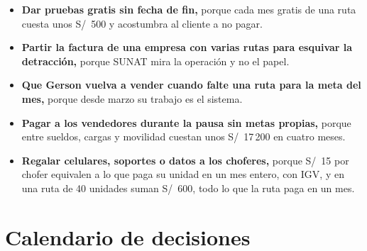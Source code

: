 \documentclass[10.5pt,a4paper]{article}
\begin{document}
\begin{itemize}
\item \textbf{Dar pruebas gratis sin fecha de fin,} porque cada mes gratis de una ruta cuesta unos S/~500 y acostumbra al cliente a no pagar.
\item \textbf{Partir la factura de una empresa con varias rutas para esquivar la detracción,} porque SUNAT mira la operación y no el papel.
\item \textbf{Que Gerson vuelva a vender cuando falte una ruta para la meta del mes,} porque desde marzo su trabajo es el sistema.
\item \textbf{Pagar a los vendedores durante la pausa sin metas propias,} porque entre sueldos, cargas y movilidad cuestan unos S/~17\,200 en cuatro meses.
\item \textbf{Regalar celulares, soportes o datos a los choferes,} porque S/~15 por chofer equivalen a lo que paga su unidad en un mes entero, con IGV, y en una ruta de 40 unidades suman S/~600, todo lo que la ruta paga en un mes.
\end{itemize}

\section{Calendario de decisiones}
\end{document}
